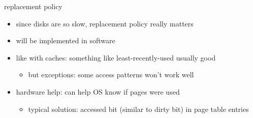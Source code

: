 \begin{frame}{replacement policy}
    \begin{itemize}
    \item since disks are so slow, replacement policy really matters
    \item will be implemented in software
        \vspace{.5cm}
    \item like with caches: something like least-recently-used usually good
        \begin{itemize}
        \item but exceptions: some access patterns won't work well
        \end{itemize}
    \item hardware help: can help OS know if pages were used
        \begin{itemize}
        \item typical solution: accessed bit (similar to dirty bit) in page table entries
        \end{itemize}
    \end{itemize}
\end{frame}
